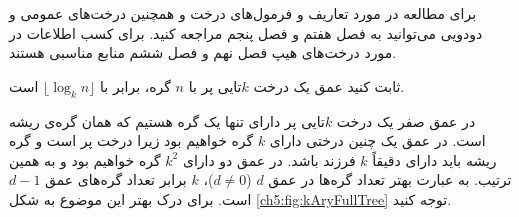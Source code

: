
برای مطالعه در مورد تعاریف و فرمول‌های درخت و همچنین درخت‌های عمومی و دودویی می‌توانید به فصل هفتم {\cite{ebrahimi}} و فصل پنجم {\cite{horowitz}} مراجعه کنید. برای کسب اطلاعات در مورد درخت‌های هیپ فصل نهم {\cite{ebrahimi}} و فصل ششم {\cite{weiss}} منابع مناسبی هستند.


 ثابت کنید عمق یک درخت {$k$}تایی پر با {$n$} گره، برابر با {$\lfloor \log_k n \rfloor$} است.


در عمق صفر یک درخت {$k$}تایی پر دارای تنها یک گره هستیم که همان گره‌ی ریشه است. در عمق یک چنین درختی دارای {$k$} گره خواهیم بود زیرا درخت پر است و گره ریشه باید دارای دقیقاً {$k$} فرزند باشد. در عمق دو دارای {$k^2$} گره خواهیم بود و به همین ترتیب. به عبارت بهتر تعداد گره‌ها در عمق {$d$} ({$d \neq 0$})، {$k$} برابر تعداد گره‌های عمق {$d-1$} است. برای درک بهتر این موضوع به شکل {\eqref{ch5:fig:kAryFullTree}} توجه کنید.

